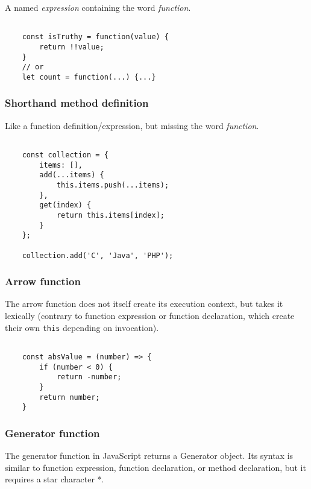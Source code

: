 \documentclass{scrartcl}
\begin{document}
A named \textit{expression} containing the word \textit{function}.

\begin{lstlisting}[style=ES6]

    const isTruthy = function(value) {
        return !!value;
    }
    // or
    let count = function(...) {...}

\end{lstlisting}

\subsubsection{Shorthand method definition}

Like a function definition/expression, but missing the word \textit{function}.

\begin{lstlisting}[style=ES6]

    const collection = {
        items: [],
        add(...items) {
            this.items.push(...items);
        },
        get(index) {
            return this.items[index];
        }
    };

    collection.add('C', 'Java', 'PHP');

\end{lstlisting}

\subsubsection{Arrow function}

The arrow function does not itself create its execution context, but takes it lexically (contrary to function expression or function declaration, which create their own \lstinline|this| depending on invocation).

\begin{lstlisting}[style=ES6]

    const absValue = (number) => {
        if (number < 0) {
            return -number;
        }
        return number;
    }

\end{lstlisting}

\subsubsection{Generator function}

The generator function in JavaScript returns a Generator object.
Its syntax is similar to function expression, function declaration, or method declaration, but it requires a star character *.
\end{document}
